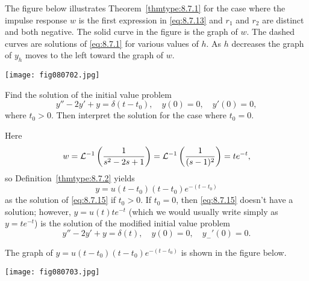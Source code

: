 \documentclass{ximera}
\begin{document}
The figure below %
illustrates Theorem~\ref{thmtype:8.7.1} for the
case where the impulse response $w$ is the first expression in
\eqref{eq:8.7.13} and $r_1$ and $r_2$ are distinct and both negative. The
solid curve in the figure is the graph of $w$. The dashed curves are
solutions of \eqref{eq:8.7.1} for various values of $h$. As $h$ decreases
the graph of $y_h$ moves to the left toward the graph of $w$.

\begin{image}
 \texttt{[image: fig080702.jpg]}
\end{image}



\begin{example}\label{example:8.7.1}  Find the solution of the initial
value problem
\begin{equation} \label{eq:8.7.15}
y''-2y'+y=\delta(t-t_0), \quad  y(0)=0,\quad y'(0)=0,
\end{equation}
where $t_0>0$. Then interpret the solution for the case where $t_0=0$.
\begin{explanation}
Here
$$
w={\cal L}^{-1}\left(\frac{1}{s^2-2s+1}\right)={\cal L}^{-1}\left(
\frac{1}{(s-1)^2}\right)=te^{-t},
$$
so  Definition~\ref{thmtype:8.7.2} yields
$$
y=u(t-t_0)(t-t_0)e^{-(t-t_0)}
$$
as the solution of  \eqref{eq:8.7.15} if $t_0>0$. If $t_0=0$,
then \eqref{eq:8.7.15} doesn't have a solution; however,
$y=u(t)te^{-t}$
(which we would usually write simply as $y=te^{-t}$) is the solution
of the modified initial value problem
$$
y''-2y'+y=\delta(t), \quad  y(0)=0,\quad y_-'(0)=0.
$$

The graph of $y=u(t-t_0)(t-t_0)e^{-(t-t_0)}$ is shown in
the figure below.  %
\end{explanation}
\end{example}

\begin{image}
 \texttt{[image: fig080703.jpg]}
\end{image}

\end{document}
